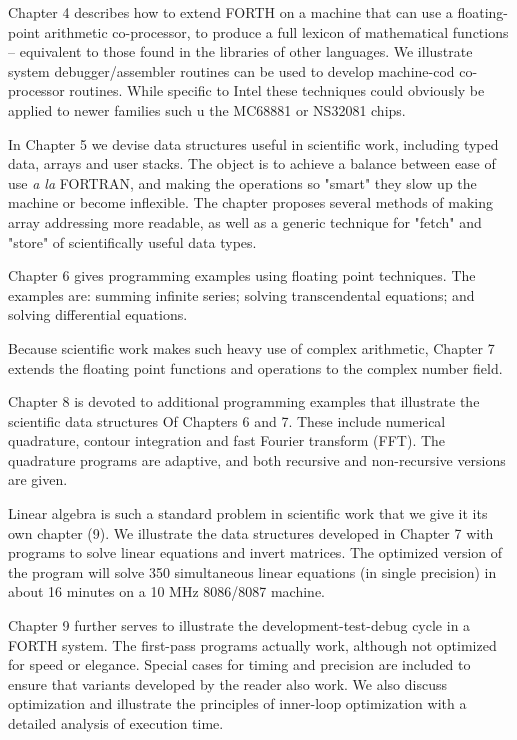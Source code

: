 Chapter 4 describes how to extend FORTH on a machine that can use a floating-point arithmetic co-processor, to produce a full lexicon of mathematical functions -- equivalent to those found in the libraries of other languages. We illustrate system debugger/assembler routines can be used to develop machine-cod co-processor routines. While specific to Intel these techniques could obviously be applied to newer families such u the MC68881 or NS32081 chips.

In Chapter 5 we devise data structures useful in scientific work, including typed data, arrays and user stacks. The object is to achieve a balance between ease of use \textit{a la} FORTRAN, and making the operations so "smart" they slow up the machine or become inflexible. The chapter proposes several methods of making array addressing more readable, as well as a generic technique for "fetch" and "store" of scientifically useful data types.
 
Chapter 6 gives programming examples using floating point techniques. The examples are: summing infinite series; solving transcendental equations; and solving differential equations.
 
Because scientific work makes such heavy use of complex arithmetic, Chapter 7 extends the floating point functions and operations to the complex number field.

Chapter 8 is devoted to additional programming examples that illustrate the scientific data structures Of Chapters 6 and 7. These include numerical quadrature, contour integration and fast Fourier transform (FFT). The quadrature programs are adaptive, and both recursive and non-recursive versions are given.
 
Linear algebra is such a standard problem in scientific work that we give it its own chapter (9). We illustrate the data structures developed in Chapter 7 with programs to solve linear equations and invert matrices. The optimized version of the program will solve 350 simultaneous linear equations (in single precision) in about 16 minutes on a 10 MHz 8086/8087 machine.

Chapter 9 further serves to illustrate the development-test-debug cycle in a FORTH system. The first-pass programs actually work, although not optimized for speed or elegance. Special cases for timing and precision are included to ensure that variants developed by the reader also work. We also discuss optimization and illustrate the principles of inner-loop optimization with a detailed analysis of execution time. 

